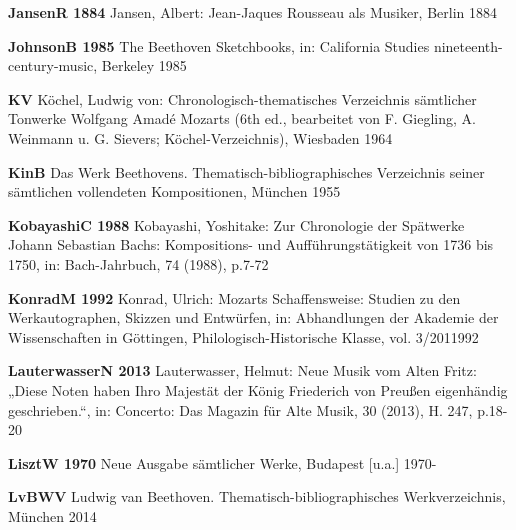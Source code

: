 \documentclass[a4paper, twocolumn, 11pt]{book}
\begin{document}
  \textbf{JansenR 1884}\hspace{10pt}
  Jansen, Albert: Jean-Jaques Rousseau als Musiker, Berlin 1884 \newline 


  \textbf{JohnsonB 1985}\hspace{10pt}
  The Beethoven Sketchbooks, in: California Studies nineteenth-century-music, Berkeley 1985 \newline 


  \textbf{KV}\hspace{10pt}
  Köchel, Ludwig von: Chronologisch-thematisches Verzeichnis sämtlicher Tonwerke Wolfgang Amadé Mozarts (6th ed., bearbeitet von F. Giegling, A. Weinmann u. G. Sievers; Köchel-Verzeichnis), Wiesbaden 1964 \newline 


  \textbf{KinB}\hspace{10pt}
  Das Werk Beethovens. Thematisch-bibliographisches Verzeichnis seiner sämtlichen vollendeten Kompositionen, München 1955 \newline 


  \textbf{KobayashiC 1988}\hspace{10pt}
  Kobayashi, Yoshitake: Zur Chronologie der Spätwerke Johann Sebastian Bachs: Kompositions- und Aufführungstätigkeit von 1736 bis 1750, in: Bach-Jahrbuch, 74 (1988), p.7-72 \newline 


  \textbf{KonradM 1992}\hspace{10pt}
  Konrad, Ulrich: Mozarts Schaffensweise: Studien zu den Werkautographen, Skizzen und Entwürfen, in: Abhandlungen der Akademie der Wissenschaften in Göttingen, Philologisch-Historische Klasse, vol. 3/2011992 \newline 


  \textbf{LauterwasserN 2013}\hspace{10pt}
  Lauterwasser, Helmut: Neue Musik vom {\textquotedbl}Alten Fritz{\textquotedbl}: „Diese Noten haben Ihro Majestät der König Friederich von Preußen eigenhändig geschrieben.“, in: Concerto: Das Magazin für Alte Musik, 30 (2013), H. 247, p.18-20 \newline 


  \textbf{LisztW 1970}\hspace{10pt}
  Neue Ausgabe sämtlicher Werke, Budapest [u.a.] 1970- \newline 


  \textbf{LvBWV}\hspace{10pt}
  Ludwig van Beethoven. Thematisch-bibliographisches Werkverzeichnis, München 2014 \newline 
\end{document}
